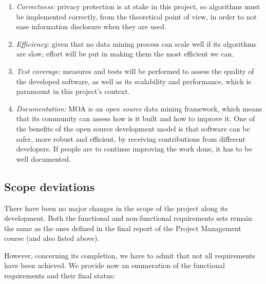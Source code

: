 \begin{enumerate}[leftmargin=1.5cm, label=\textbf{NFR\arabic*}]
	\item
	\textit{Correctness:} privacy protection is at stake in this project, so algorithms must be implemented correctly, from the theoretical point of view, in order to not ease information disclosure when they are used.
	
	\item
	\textit{Efficiency:} given that no data mining process can scale well if its algorithms are slow, effort will be put in making them the most efficient we can.
	
	\item
	\textit{Test coverage:} measures and tests will be performed to assess the quality of the developed software, as well as its scalability and performance, which is paramount in this project’s context.
	
	\item
	\textit{Documentation:} MOA is an \textit{open source} data mining framework, which means that its community can assess how is it built and how to improve it. One of the benefits of the open source development model is that software can be safer, more robust and efficient, by receiving contributions from different developers. If people are to continue improving the work done, it has to be well documented.
\end{enumerate}

\subsection{Scope deviations}
\label{Management:Scope:Deviations}

There have been no major changes in the scope of the project along its development. Both the functional and non-functional requirements sets remain the same as the ones defined in the final report of the Project Management course (and also listed above).

However, concerning its completion, we have to admit that not all requirements have been achieved. We provide now an enumeration of the functional requirements and their final status:

